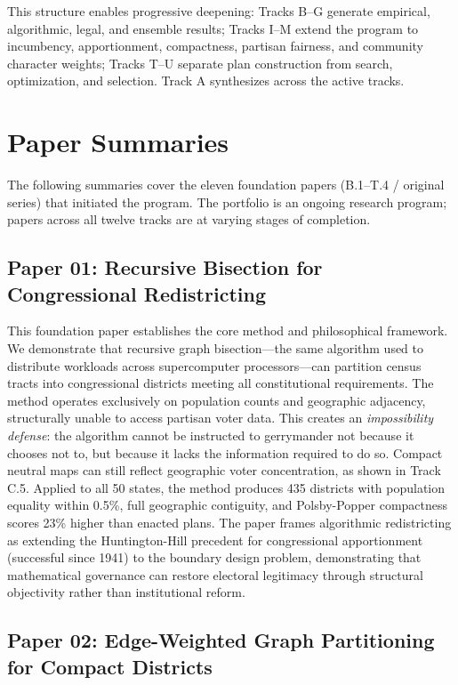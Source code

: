 \documentclass[11pt]{article}
\begin{document}
This structure enables progressive deepening: Tracks B--G generate empirical, algorithmic, legal, and ensemble results; Tracks I--M extend the program to incumbency, apportionment, compactness, partisan fairness, and community character weights; Tracks T--U separate plan construction from search, optimization, and selection. Track A synthesizes across the active tracks.

\section*{Paper Summaries}

The following summaries cover the eleven foundation papers (B.1--T.4 / original series) that initiated the program. The portfolio is an ongoing research program; papers across all twelve tracks are at varying stages of completion.

\subsection*{Paper 01: Recursive Bisection for Congressional Redistricting}

This foundation paper establishes the core method and philosophical framework. We demonstrate that recursive graph bisection---the same algorithm used to distribute workloads across supercomputer processors---can partition census tracts into congressional districts meeting all constitutional requirements. The method operates exclusively on population counts and geographic adjacency, structurally unable to access partisan voter data. This creates an \emph{impossibility defense}: the algorithm cannot be instructed to gerrymander not because it chooses not to, but because it lacks the information required to do so. Compact neutral maps can still reflect geographic voter concentration, as shown in Track C.5. Applied to all 50 states, the method produces 435 districts with population equality within 0.5\%, full geographic contiguity, and Polsby-Popper compactness scores 23\% higher than enacted plans. The paper frames algorithmic redistricting as extending the Huntington-Hill precedent for congressional apportionment (successful since 1941) to the boundary design problem, demonstrating that mathematical governance can restore electoral legitimacy through structural objectivity rather than institutional reform.

\subsection*{Paper 02: Edge-Weighted Graph Partitioning for Compact Districts}
\end{document}
